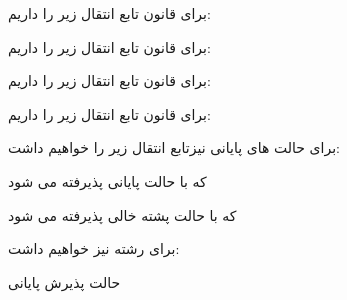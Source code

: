 \documentclass[]{article}
\begin{document}
\begin{center}
\end{center}

برای قانون  تابع انتقال زیر را داریم:
\begin{center}
\end{center}

برای قانون  تابع انتقال زیر را داریم:

\begin{center}
\end{center}

برای قانون  تابع انتقال زیر را داریم:

\begin{center}
\end{center}

برای قانون  تابع انتقال زیر را داریم:
\begin{center}
\end{center}

برای حالت های پایانی نیزتابع انتقال زیر را خواهیم داشت:
\begin{center}
\end{center}

که با حالت پایانی پذیرفته می شود
\begin{center}
\end{center}
که با حالت پشته خالی پذیرفته می شود

برای رشته  نیز خواهیم داشت:

\begin{flushleft}
\end{flushleft}
حالت پذیرش پایانی
\end{document}
